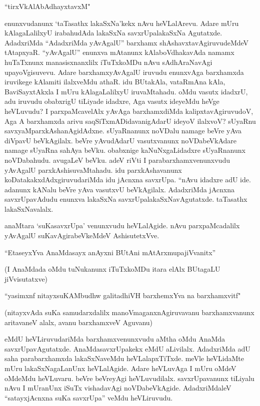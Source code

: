 \begin{shloka}
``tirxVkAlAbAdhayxtavxM"
\end{shloka}

enunxvudanunx `taTasathx lakaSxNa'kekx nAvu heVLalArevu. Adare mUru kAlagaLalilxyU irabahudAda lakaSxNa savxrUpalakaSxNa Agutatxde. AdadxriMda ``AdadxriMda yAvAgalU'' barxhamx shAshavxtavAgiruvudeMdeV tAtapxyaR. ``yAvAgalU'' enunxva mAtanunx kAlaboVdhakavAda namamx huTaTxnunx manasisxnanxlilx iTuTxkoMDu nAvu sAdhAraNavAgi upayoVgisuvevu. Adare barxhamxyAvAgalU iruvudu enunxvAga barxhamxda iruvikege kAlamiti ilalxveMdu athaR. idu BUtakAla, vataRmAna kAla, BaviSayxtAkxla I mUru kAlagaLalilxyU iruvaMtahadu. oMdu vasutx idadxrU, adu iruvudu obabxrigU tiLiyade idadxre, Aga vasutx ideyeMdu heVge heVLuvudu? I parxpaMcavelAlx yAvAga barxhamxdiMda kalipxtavAgiruvudoV, Aga A barxhamxda arivu saqSiTxmADidavanigAdarU ideyoV ilalxvoV? sUyaRnu savxyaMparxkAshanAgidAdxne. sUyaRnanunx noVDalu namage beVre yAva diVpavU beVkAgilalx. beVre yAvudAdarU vasutxvanunx noVDabeVkAdare namage sUyaRna sahAya beVku. obabxnige kaNuNxgaLidadxre sUyaRnanunx noVDabahudu. avugaLeV beVku. adeV riVti I parabarxhamxvenunxvudu yAvAgalU parxkAshisuvaMtahadu. idu parxkAshavanunx koDatakakxdAdxgiruvudariMda idu jAcnxna savxrUpa. ``nAvu idadxre adU ide. adanunx kANalu beVre yAva vasutxvU beVkAgilalx. AdadxriMda jAcnxna savxrUpavAdudu enunxva lakaSxNa savxrUpalakaSxNavAgutatxde. taTasathx lakaSxNavalalx.

anaMtara `suKasavxrUpa' venunxvudu heVLalAgide. nAvu parxpaMcadalilx yAvAgalU suKavAgirabeVkeMdeV AshisutetxVve.

\begin{shloka}
``EtaseyxYva AnaMdasayx anAyxni BUtAni mAtArxmupajiVvanitx''
\end{shloka}

(I AnaMdada oMdu tuNukanunx iTuTxkoMDu itara elAlx BUtagaLU jiVvisutatxve)

\begin{shloka}
``yasimxnf nitayxsuKAMbudhw galitadhiVH barxhemxYva na barxhamxvitf"
\end{shloka}

(nitayxvAda suKa samudarxdalilx manoVmaganxnAgiruvavanu barxhamxvanunx aritavaneV alalx, avanu barxhamxveV Aguvanu)


eMdU heVLiruvudariMda barxhamxvenunxvudu aMtha oMdu AnaMda savxrUpavAgutatxde. AnaMdasavxrUpakekx eMdU aLivilalx. AdadxriMda adU saha parabarxhamxda lakaSxNaveMdu heVLalapxTiTxde. meVle heVLidaMte mUru lakaSxNagaLanUnx heVLalAgide. Adare heVLuvAga I mUru oMdeV oMdeMdu heVLuvaru. beVre beVreyAgi heVLuvudilalx. savxrUpavanunx tiLiyalu nAvu I mUranUnx iSuTx vishadavAgi noVDabeVkAgide. AdadxriMdaleV ``satayxjAcnxna suKa savxrUpa'' veMdu heVLiruvudu. 

